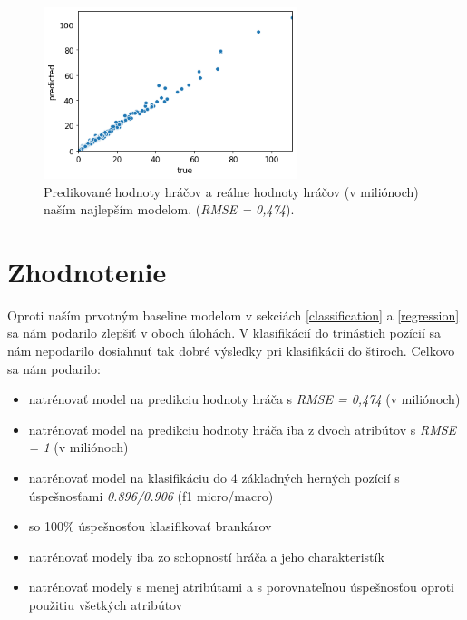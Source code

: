 \documentclass[runningheads]{llncs}
\begin{document}
\begin{figure}[htp]
    \centering
    \includegraphics[height=5cm]{images/gbt_regression}
    \caption{Predikované hodnoty hráčov a reálne hodnoty hráčov (v miliónoch) naším najlepším modelom. (\textit{RMSE = 0,474}).}
    \label{fig:gbt_regression}
\end{figure}


\section{Zhodnotenie}

Oproti naším prvotným baseline modelom v sekciách \ref{classification}  a \ref{regression} sa nám podarilo zlepšiť v oboch úlohách. V klasifikácií do trinástich pozícií sa nám nepodarilo dosiahnuť tak dobré výsledky pri klasifikácii do štiroch. Celkovo sa nám podarilo:
\begin{itemize}
    \item natrénovať model na predikciu hodnoty hráča s \textit{RMSE = 0,474} (v miliónoch)
    \item natrénovať model na predikciu hodnoty hráča iba z dvoch atribútov s \textit{RMSE = 1} (v miliónoch)
    \item natrénovať model na klasifikáciu do 4 základných herných pozícií s úspešnosťami \textit{0.896/0.906} (f1 micro/macro)
    \item so 100\% úspešnosťou klasifikovať brankárov
    \item natrénovať modely iba zo schopností hráča a jeho charakteristík
    \item natrénovať modely s menej atribútami a s porovnateľnou úspešnosťou oproti použitiu všetkých atribútov
\end{itemize}

\newpage



\end{document}

